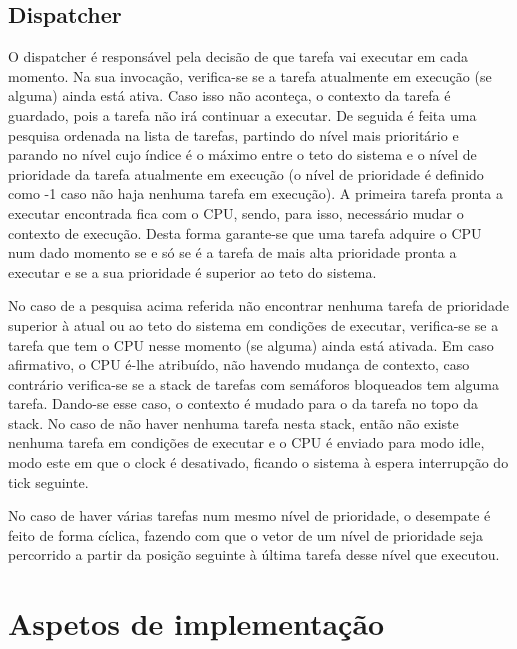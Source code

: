 \documentclass[journal]{IEEEtran}
\begin{document}
\subsection{Dispatcher}
O dispatcher é responsável pela decisão de que tarefa vai executar em cada momento.
Na sua invocação, verifica-se se a tarefa atualmente em execução (se alguma) ainda está ativa.
Caso isso não aconteça, o contexto da tarefa é guardado, pois a tarefa não irá continuar a executar.
De seguida é feita uma pesquisa ordenada na lista de tarefas, partindo do nível mais prioritário e parando no nível cujo índice é o máximo entre o teto do sistema e o nível
de prioridade da tarefa atualmente em execução (o nível de prioridade é definido como -1 caso não haja nenhuma tarefa em execução).
A primeira tarefa pronta a executar encontrada fica com o CPU, sendo, para isso, necessário mudar o contexto de execução.
Desta forma garante-se que uma tarefa adquire o CPU num dado momento se e só se é a tarefa de mais alta prioridade pronta a executar e se a sua prioridade é superior ao
teto do sistema.

No caso de a pesquisa acima referida não encontrar nenhuma tarefa de prioridade superior à atual ou ao teto do sistema em condições de executar, verifica-se se a tarefa
que tem o CPU nesse momento (se alguma) ainda está ativada.
Em caso afirmativo, o CPU é-lhe atribuído, não havendo mudança de contexto, caso contrário verifica-se se a stack de tarefas com semáforos bloqueados tem alguma tarefa.
Dando-se esse caso, o contexto é mudado para o da tarefa no topo da stack.
No caso de não haver nenhuma tarefa nesta stack, então não existe nenhuma tarefa em condições de executar e o CPU é enviado para modo idle, modo este em que o clock é
desativado, ficando o sistema à espera interrupção do tick seguinte.

No caso de haver várias tarefas num mesmo nível de prioridade, o desempate é feito de forma cíclica, fazendo com que o vetor de um nível de prioridade seja percorrido a
partir da posição seguinte à última tarefa desse nível que executou.

\section{Aspetos de implementação}
\end{document}
